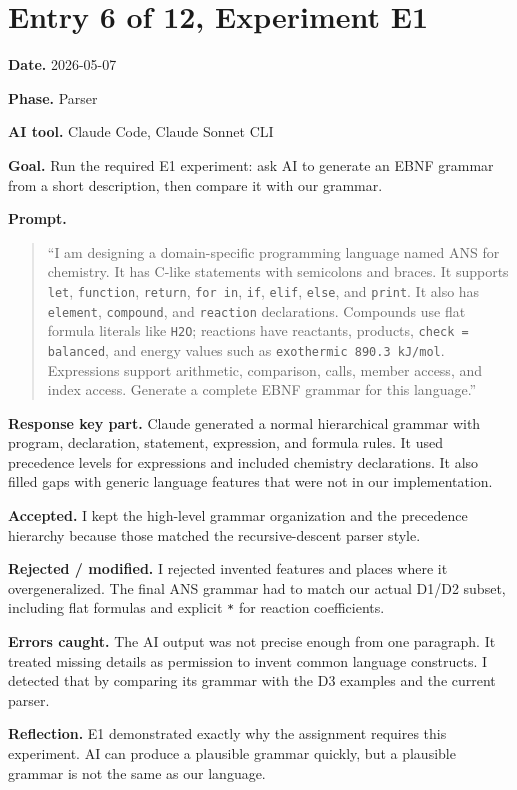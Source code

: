 \documentclass[11pt,a4paper]{article}
\newcommand{\code}[1]{\texttt{#1}}
\newcommand{\field}[2]{\textbf{#1.} #2\par}
\newcommand{\prompt}[1]{%
  \textbf{Prompt.}
  \begin{quote}\small #1\end{quote}
}
\begin{document}
\section{Entry 6 of 12, Experiment E1}
\field{Date}{2026-05-07}
\field{Phase}{Parser}
\field{AI tool}{Claude Code, Claude Sonnet CLI}
\field{Goal}{Run the required E1 experiment: ask AI to generate an EBNF grammar from a short description, then compare it with our grammar.}
\prompt{``I am designing a domain-specific programming language named ANS for chemistry. It has C-like statements with semicolons and braces. It supports \code{let}, \code{function}, \code{return}, \code{for in}, \code{if}, \code{elif}, \code{else}, and \code{print}. It also has \code{element}, \code{compound}, and \code{reaction} declarations. Compounds use flat formula literals like \code{H2O}; reactions have reactants, products, \code{check = balanced}, and energy values such as \code{exothermic 890.3 kJ/mol}. Expressions support arithmetic, comparison, calls, member access, and index access. Generate a complete EBNF grammar for this language.''}
\field{Response key part}{Claude generated a normal hierarchical grammar with program, declaration, statement, expression, and formula rules. It used precedence levels for expressions and included chemistry declarations. It also filled gaps with generic language features that were not in our implementation.}
\field{Accepted}{I kept the high-level grammar organization and the precedence hierarchy because those matched the recursive-descent parser style.}
\field{Rejected / modified}{I rejected invented features and places where it overgeneralized. The final ANS grammar had to match our actual D1/D2 subset, including flat formulas and explicit \code{*} for reaction coefficients.}
\field{Errors caught}{The AI output was not precise enough from one paragraph. It treated missing details as permission to invent common language constructs. I detected that by comparing its grammar with the D3 examples and the current parser.}
\field{Reflection}{E1 demonstrated exactly why the assignment requires this experiment. AI can produce a plausible grammar quickly, but a plausible grammar is not the same as our language.}
\end{document}
